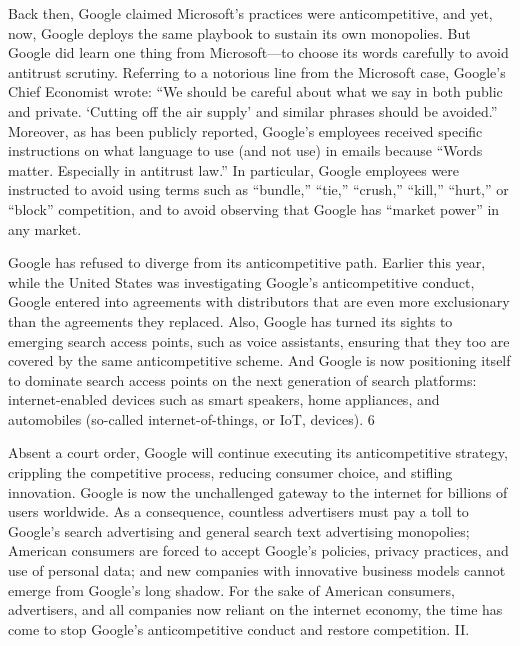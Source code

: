 \documentclass[11pt,b5paper]{scrartcl}
\begin{document}

Back then, Google claimed Microsoft’s practices were anticompetitive, and yet,
now, Google deploys the same playbook to sustain its own monopolies. But Google did learn
one thing from Microsoft—to choose its words carefully to avoid antitrust scrutiny. Referring to
a notorious line from the Microsoft case, Google’s Chief Economist wrote: “We should be
careful about what we say in both public and private. ‘Cutting off the air supply’ and similar
phrases should be avoided.” Moreover, as has been publicly reported, Google’s employees
received specific instructions on what language to use (and not use) in emails because “Words
matter. Especially in antitrust law.” In particular, Google employees were instructed to avoid
using terms such as “bundle,” “tie,” “crush,” “kill,” “hurt,” or “block” competition, and to avoid
observing that Google has “market power” in any market.


Google has refused to diverge from its anticompetitive path. Earlier this year,
while the United States was investigating Google’s anticompetitive conduct, Google entered into
agreements with distributors that are even more exclusionary than the agreements they replaced.
Also, Google has turned its sights to emerging search access points, such as voice assistants,
ensuring that they too are covered by the same anticompetitive scheme. And Google is now
positioning itself to dominate search access points on the next generation of search platforms:
internet-enabled devices such as smart speakers, home appliances, and automobiles (so-called
internet-of-things, or IoT, devices).
6


Absent a court order, Google will continue executing its anticompetitive strategy,
crippling the competitive process, reducing consumer choice, and stifling innovation. Google is
now the unchallenged gateway to the internet for billions of users worldwide. As a consequence,
countless advertisers must pay a toll to Google’s search advertising and general search text
advertising monopolies; American consumers are forced to accept Google’s policies, privacy
practices, and use of personal data; and new companies with innovative business models cannot
emerge from Google’s long shadow. For the sake of American consumers, advertisers, and all
companies now reliant on the internet economy, the time has come to stop Google’s
anticompetitive conduct and restore competition.
II.
\end{document}
